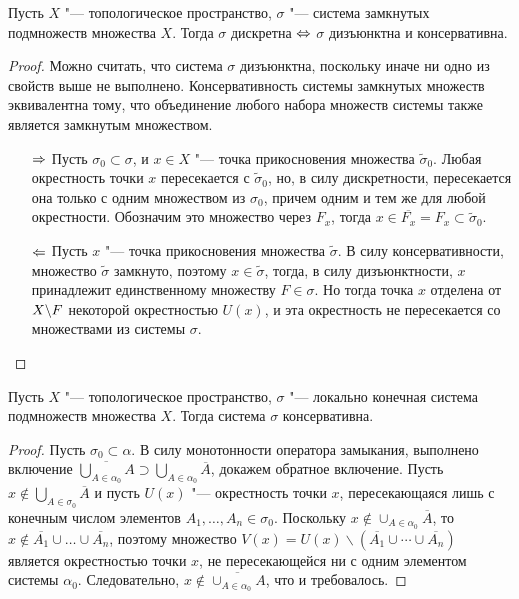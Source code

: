 \begin{proposition}
    Пусть $X$ "--- топологическое пространство, $\sigma$ "--- система замкнутых подмножеств множества $X$. Тогда $\sigma$ дискретна $\Leftrightarrow$ $\sigma$ дизъюнктна и консервативна.
\end{proposition}

\begin{proof}
    Можно считать, что система $\sigma$ дизъюнктна, поскольку иначе ни одно из свойств выше не выполнено. Консервативность системы замкнутых множеств эквивалентна тому, что объединение любого набора множеств системы также является замкнутым множеством.

    \begin{itemize}
        \item[$\Rightarrow$] Пусть $\sigma_0 \subset \sigma$, и $x \in X$ "--- точка прикосновения множества $\widetilde\sigma_0$. Любая окрестность точки $x$ пересекается с $\widetilde\sigma_0$, но, в силу дискретности, пересекается она только с одним множеством из $\sigma_0$, причем одним и тем же для любой окрестности. Обозначим это множество через $F_x$, тогда $x \in \overline{F_x} = F_x \subset \widetilde\sigma_0$.
        
        \item[$\Leftarrow$] Пусть $x$ "--- точка прикосновения множества $\widetilde\sigma$. В силу консервативности, множество $\widetilde\sigma$ замкнуто, поэтому $x \in \widetilde\sigma$, тогда, в силу дизъюнктности, $x$ принадлежит единственному множеству $F \in \sigma$. Но тогда точка $x$ отделена от $X \backslash F$ некоторой окрестностью $U(x)$, и эта окрестность не пересекается со множествами из системы $\sigma$.\qedhere
    \end{itemize}
\end{proof}

\begin{proposition}
    Пусть $X$ "--- топологическое пространство, $\sigma$ "--- локально конечная система подмножеств множества $X$. Тогда система $\sigma$ консервативна.
\end{proposition}

\begin{proof}
    Пусть $\sigma_0\subset \alpha$. В силу монотонности оператора замыкания, выполнено включение $\overline{\bigcup_{A\in\alpha_0}A} \supset \bigcup_{A\in \alpha_0}\overline{A}$, докажем обратное включение. Пусть $x \notin \bigcup_{A\in\sigma_0}\overline{A}$ и пусть $U(x)$ "--- окрестность точки $x$, пересекающаяся лишь с конечным числом элементов $A_1, \dotsc, A_n \in \sigma_0$. Поскольку $x\notin\cup_{A\in\alpha_0}\overline{A}$, то $x \notin \overline{A_1}\cup\ldots\cup\overline{A_n}$, поэтому множество $V(x) = U(x)\backslash (\overline{A_1}\cup\dotsb\cup\overline{A_n})$ является окрестностью точки $x$, не пересекающейся ни с одним элементом системы $\alpha_0$. Следовательно, $x\notin\overline{\cup_{A\in\alpha_0}A}$, что и требовалось.
\end{proof}

